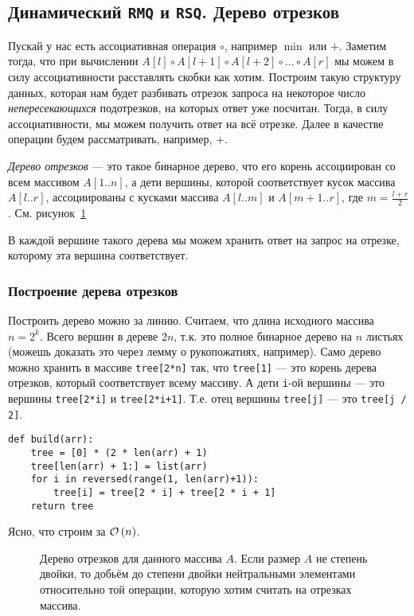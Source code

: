 \subsection{Динамический \texttt{RMQ} и \texttt{RSQ}. Дерево отрезков}
Пускай у нас есть ассоциативная операция $\circ$, например $\min$ или $+$. Заметим тогда, что при вычислении $A[l] \circ A[l+1] \circ A[l+2] \circ \ldots \circ A[r]$ мы можем в силу ассоциативности расставлять скобки как хотим. Построим такую структуру данных, которая нам будет разбивать отрезок запроса на некоторое число \emph{непересекающихся} подотрезков, на которых ответ уже посчитан. Тогда, в силу ассоциативности, мы можем получить ответ на всё отрезке. Далее в качестве операции будем рассматривать, например, $+$.
\begin{defn}
\emph{Дерево отрезков} --- это такое бинарное дерево, что его корень ассоциирован со всем массивом $A[1..n]$, а дети вершины, которой соответствует кусок массива $A[l..r]$, ассоциированы с кусками массива $A[l..m]$ и $A[m+1..r]$, где $m = \frac{l + r}{2}$. См. рисунок~\ref{fig:segtree}
\end{defn}
В каждой вершине такого дерева мы можем хранить ответ на запрос на отрезке, которому эта вершина соответствует.

\subsubsection{Построение дерева отрезков}
Построить дерево можно за линию. Считаем, что длина исходного массива $n = 2^k$. Всего вершин в дереве $2n$, т.к. это полное бинарное дерево на $n$ листьях (можешь доказать это через лемму о рукопожатиях, например). Само дерево можно хранить в массиве \texttt{tree[2*n]} так, что \texttt{tree[1]} --- это корень дерева отрезков, который соответствует всему массиву. А дети \texttt{i}-ой вершины --- это вершины \texttt{tree[2*i]} и \texttt{tree[2*i+1]}. Т.е. отец вершины \texttt{tree[j]} --- это \texttt{tree[j / 2]}.
\begin{verbatim}
def build(arr):
    tree = [0] * (2 * len(arr) + 1)
    tree[len(arr) + 1:] = list(arr)
    for i in reversed(range(1, len(arr)+1)):
        tree[i] = tree[2 * i] + tree[2 * i + 1]
    return tree
\end{verbatim}
Ясно, что строим за $\mathcal{O}\left(n\right)$.
\begin{figure}[ht!]
\centering

\caption{Дерево отрезков для данного массива $A$. Если размер $A$ не степень двойки, то добьём до степени двойки нейтральными элементами относительно той операции, которую хотим считать на отрезках массива.}
\label{fig:segtree}
\end{figure}

